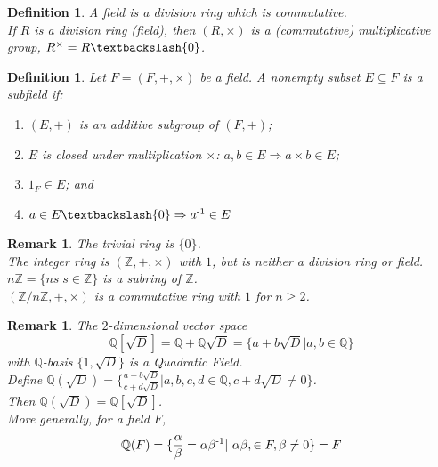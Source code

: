 \documentclass[a4paper,8pt]{article}
\newcommand{\hlt}[1]{\textit{{\color{blue}#1}}}
\theoremstyle{theorem}
\newtheorem{definition}[theorem]{Definition}
\newtheorem{remark}[theorem]{Remark}
\begin{document}
\begin{definition}
A \hlt{field} is a division ring which is commutative.\\
If $R$ is a division ring (field), then $(R, \times)$ is a (commutative) \hlt{multiplicative group}, $R^\times = R \textbackslash \{0\}$.\\
\end{definition}


\begin{definition}
Let $F = (F, +, \times) $ be a field. A nonempty subset $E \subseteq F$ is a \hlt{subfield} if:
\begin{enumerate}[label=(\roman*)]
\item $(E, +)$ is an additive subgroup of $(F, +)$;
\item $E$ is closed under multiplication $\times$: $a, b \in E \Rightarrow a \times b \in E$;
\item $1_F \in E$; and
\item $a \in E \textbackslash \{0\} \Rightarrow a \textsuperscript{-1} \in E$
\end{enumerate}
\end{definition}


\begin{remark}
The \hlt{trivial ring} is $\{0\}$.\\
The \hlt{integer ring} is $(\mathbb{Z}, +, \times )$ with $ 1 $, but is neither a division ring or field.\\
$n \mathbb{Z} = \{ns | s \in \mathbb{Z}\} $ is a subring of $\mathbb{Z}$.\\
$(\mathbb{Z} / n \mathbb{Z}, +, \times) $ is a commutative ring with $ 1 $ for $ n \geq 2 $.\\
\end{remark}


\begin{remark}
The $2$-dimensional vector space 
\begin{equation}
\mathbb{Q}[\sqrt{D}] = \mathbb{Q} + \mathbb{Q}\sqrt{D} = \{a+b\sqrt{D}|a, b \in \mathbb{Q} \}
\nonumber
\end{equation}
with $\mathbb{Q}$-basis $\{1, \sqrt{D} \}$ is a \hlt{Quadratic Field}.\\
Define $\mathbb{Q}(\sqrt{D}) = \{ \frac{ a+b\sqrt{D} }{ c+d\sqrt{D} } | a, b, c, d \in \mathbb{Q}, c + d\sqrt{D} \neq 0 \} $. \\
Then $\mathbb{Q}(\sqrt{D}) = \mathbb{Q}[\sqrt{D}]$.\\
More generally, for a field $F$, 
\begin{equation}
\mathbb{Q}(F) = \{\frac{\alpha}{\beta} = \alpha \beta \textsuperscript{-1} |\ \alpha \beta , \in F, \beta \neq 0\} = F
\nonumber
\end{equation}
\end{remark}
\end{document}
